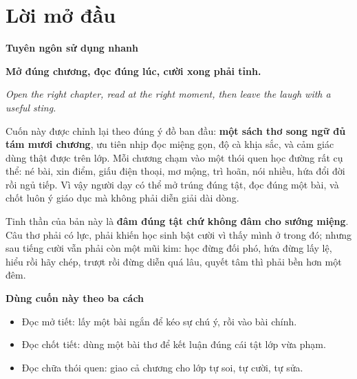 \chapter*{Lời mở đầu}

\begin{tcolorbox}[
	enhanced,
	colback=white,
	colframe=goldaccent!70!chapterline,
	boxrule=0.7pt,
	arc=2mm,
	left=3mm,
	right=3mm,
	top=2.2mm,
	bottom=2mm,
	borderline west={1.5mm}{0pt}{tealaccent!80!black}
]
{\small\bfseries\color{chapterline} Tuyên ngôn sử dụng nhanh\par}
\vspace{0.3em}
{\large\bfseries\color{titlecolor} Mở đúng chương, đọc đúng lúc, cười xong phải tỉnh.\par}
\vspace{0.28em}
{\footnotesize\itshape\color{noteink} Open the right chapter, read at the right moment, then leave the laugh with a useful sting.\par}
\end{tcolorbox}

Cuốn này được chỉnh lại theo đúng ý đồ ban đầu: \textbf{một sách thơ song ngữ đủ tám mươi chương}, ưu tiên nhịp đọc miệng gọn, độ cà khịa sắc, và cảm giác dùng thật được trên lớp. Mỗi chương chạm vào một thói quen học đường rất cụ thể: né bài, xin điểm, giấu điện thoại, mơ mộng, trì hoãn, nói nhiều, hứa đổi đời rồi ngủ tiếp. Vì vậy người dạy có thể mở trúng đúng tật, đọc đúng một bài, và chốt luôn ý giáo dục mà không phải diễn giải dài dòng.

Tinh thần của bản này là \textbf{đâm đúng tật chứ không đâm cho sướng miệng}. Câu thơ phải có lực, phải khiến học sinh bật cười vì thấy mình ở trong đó; nhưng sau tiếng cười vẫn phải còn một mũi kim: học đừng đối phó, hứa đừng lấy lệ, hiểu rồi hãy chép, trượt rồi đừng diễn quá lâu, quyết tâm thì phải bền hơn một đêm.

\begin{tcolorbox}[
	enhanced,
	colback=softgray,
	colframe=softline,
	boxrule=0.5pt,
	arc=2mm,
	left=2.6mm,
	right=2.6mm,
	top=1.6mm,
	bottom=1.5mm
]
{\small\bfseries\color{titlecolor} Dùng cuốn này theo ba cách\par}
\vspace{0.25em}
\begin{itemize}
\item Đọc mở tiết: lấy một bài ngắn để kéo sự chú ý, rồi vào bài chính.
\item Đọc chốt tiết: dùng một bài thơ để kết luận đúng cái tật lớp vừa phạm.
\item Đọc chữa thói quen: giao cả chương cho lớp tự soi, tự cười, tự sửa.
\end{itemize}
\end{tcolorbox}

